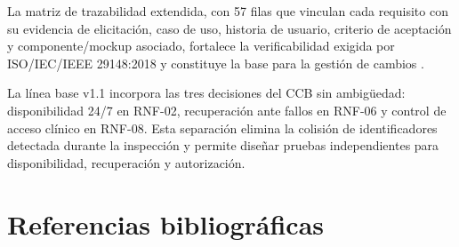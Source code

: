\documentclass[11pt,a4paper]{article}
\begin{document}
	La matriz de trazabilidad extendida, con 57 filas que vinculan cada requisito con su evidencia de elicitación, caso de uso, historia de usuario, criterio de aceptación y componente/mockup asociado, fortalece la verificabilidad exigida por ISO/IEC/IEEE 29148:2018 y constituye la base para la gestión de cambios \cite{iso29148,gotel1994,ramesh2001,clelandhuang2003}.
	
	La línea base v1.1 incorpora las tres decisiones del CCB sin ambigüedad: disponibilidad 24/7 en RNF-02, recuperación ante fallos en RNF-06 y control de acceso clínico en RNF-08. Esta separación elimina la colisión de identificadores detectada durante la inspección y permite diseñar pruebas independientes para disponibilidad, recuperación y autorización.
	
	
	
	\clearpage
	\section*{Referencias bibliográficas}
	\nocite{nist80063,who2021strategy,chung2000}
\end{document}

